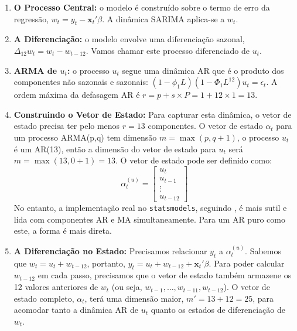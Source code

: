 \documentclass[ 12pt,a4paper ]{article} %
\begin{document}
	\begin{enumerate}
		\item \textbf{O Processo Central:} o modelo é construído sobre o termo de erro da regressão, $w_t = y_t - \mathbf{x}_t'\beta$. A dinâmica SARIMA aplica-se a $w_t$.
		
		\item \textbf{A Diferenciação:} o modelo envolve uma diferenciação sazonal, $\Delta_{12} w_t = w_t - w_{t-12}$. Vamos chamar este processo diferenciado de $u_t$.
		
		\item \textbf{ARMA de $u_t$:} o processo $u_t$ segue uma dinâmica AR que é o produto dos componentes não sazonais e sazonais: $(1 - \phi_1 L)(1 - \Phi_1 L^{12}) u_t = \epsilon_t$. %
A ordem máxima da defasagem AR é $r = p + s \times P = 1 + 12 \times 1 = 13$.
		
		\item \textbf{Construindo o Vetor de Estado:} Para capturar esta dinâmica, o vetor de estado precisa ter pelo menos $r=13$ componentes. O vetor de estado $\alpha_t$ para um processo ARMA(p,q) tem dimensão $m = \max(p, q+1)$, o processo $u_t$ é um AR(13), então a dimensão do vetor de estado para $u_t$ será $m = \max(13, 0+1) = 13$. O vetor de estado pode ser definido como:
		\[ \alpha_t^{(u)} = \begin{bmatrix} u_t \\ u_{t-1} \\ \vdots \\ u_{t-12} \end{bmatrix} \]
		No entanto, a implementação real no \texttt{statsmodels}, seguindo \cite{Koopman}, é mais sutil e lida com componentes AR e MA simultaneamente. Para um AR puro como este, a forma é mais direta.
		
		\item \textbf{A Diferenciação no Estado:} Precisamos relacionar $y_t$ a $\alpha_t^{(u)}$. Sabemos que $w_t = u_t + w_{t-12}$, portanto, $y_t = u_t + w_{t-12} + \mathbf{x}_t'\beta$.
		Para poder calcular $w_{t-12}$ em cada passo, precisamos que o vetor de estado também armazene os 12 valores anteriores de $w_t$ (ou seja, $w_{t-1}, \dots, w_{t-11}, w_{t-12}$). O vetor de estado completo, $\alpha_t$, terá uma dimensão maior, $m' = 13 + 12 = 25$, para acomodar tanto a dinâmica AR de $u_t$ quanto os estados de diferenciação de $w_t$.
		

\end{enumerate}
\end{document}
